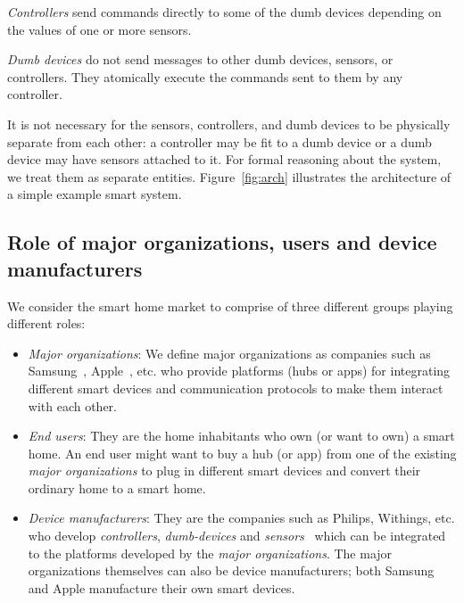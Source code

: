 \documentclass{article}
\begin{document}
\textit{Controllers} send commands directly to some of the dumb devices depending on the values of one or more sensors. 

\textit{Dumb devices} do not send messages to other dumb devices, sensors, or controllers. They atomically execute the commands sent to them by any controller. 

It is not necessary for the sensors, controllers, and dumb devices to be physically separate from each other: 
a controller may be fit to a dumb device or a dumb device may have sensors attached to it. For formal reasoning about the system, we treat them as separate entities. Figure~\ref{fig:arch} illustrates the architecture of a simple example smart system. 

\subsection{Role of major organizations, users and device manufacturers}
\label{subsec:roles}
We consider the smart home market to comprise of three different groups playing different roles:
\begin{itemize}[topsep=0pt,itemsep=0ex,partopsep=1ex,parsep=1ex]
\item \textit{Major organizations}: We define major organizations as companies such as Samsung~\cite{samsung}, Apple~\cite{homekit}, etc. who provide platforms (hubs or apps) for integrating different smart devices and communication protocols to make them interact with each other. 
\item \textit{End users}: They are the home inhabitants who own (or want to own) a smart home. An end user might want to buy a hub (or app) from one of the existing \textit{major organizations} to plug in different smart devices and convert their ordinary home to a smart home.

\item \textit{Device manufacturers}: They are the companies such as Philips, Withings, etc. who develop \textit{controllers}, \textit{dumb-devices} and \textit{sensors}~\cite{workswithsmartthings, workswithhomekit} which can be integrated to the platforms developed by the \textit{major organizations}. The major organizations themselves can also be device manufacturers; both Samsung and Apple manufacture their own smart devices.
\end{itemize}
\end{document}
